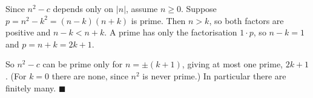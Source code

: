 Since $n^2-c$ depends only on $|n|$, assume $n\ge0$. Suppose $p=n^2-k^2=(n-k)(n+k)$ is prime. Then $n>k$, so both factors are positive and $n-k<n+k$. A prime has only the factorisation $1\cdot p$, so $n-k=1$ and $p=n+k=2k+1$.

So $n^2-c$ can be prime only for $n=\pm(k+1)$, giving at most one prime, $2k+1$. (For $k=0$ there are none, since $n^2$ is never prime.) In particular there are finitely many. $\blacksquare$
